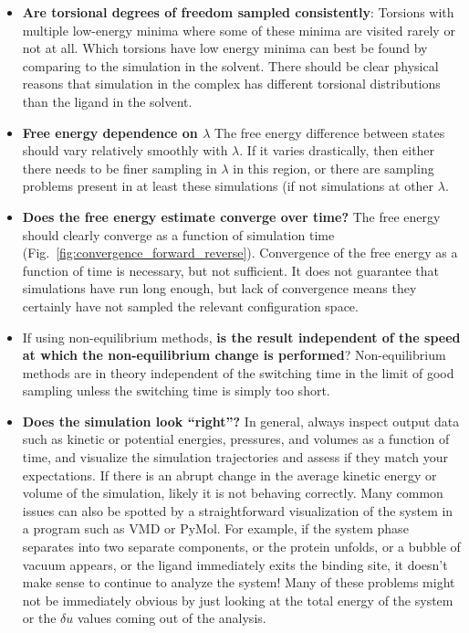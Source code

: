 \begin{itemize}
\item \textbf{Are torsional degrees of freedom sampled consistently}: Torsions with multiple low-energy minima where some of these minima are visited rarely or not at all. Which torsions have low energy minima can best be found by comparing to the simulation in the solvent. There should be clear physical reasons that simulation in the complex has different torsional distributions than the ligand in the solvent. 
\item \textbf{Free energy dependence on $\lambda$} The free energy difference between states should vary relatively smoothly with $\lambda$. If it varies drastically, then either there needs to be finer sampling in $\lambda$ in this region, or there are sampling problems present in at least these simulations (if not simulations at other $\lambda$.
\item \textbf{Does the free energy estimate converge over time?} The free energy should clearly converge as a function of simulation time (Fig.~\ref{fig:convergence_forward_reverse}). Convergence of the free energy as a function of time is necessary, but not sufficient.  It does not guarantee that simulations have run long enough, but lack of convergence means they certainly have not sampled the relevant configuration space.
\item If using non-equilibrium methods, \textbf{is the result independent of the speed at which the non-equilibrium change is performed}? Non-equilibrium methods are in theory independent of the switching time in the limit of good sampling unless the switching time is simply too short. 
\item \textbf{Does the simulation look ``right''?} In general, always inspect output data such as kinetic or potential energies, pressures, and volumes as a function of time, and visualize the simulation trajectories and assess if they match your expectations.  If there is an abrupt change in the average kinetic energy or volume of the simulation, likely it is not behaving correctly.  Many common issues can also be spotted by a straightforward visualization of the system in a program such as VMD or PyMol. For example, if the system phase separates into two separate components, or the protein unfolds, or a bubble of vacuum appears, or the ligand immediately exits the binding site, it doesn't make sense to continue to analyze the system! Many of these problems might not be immediately obvious by just looking at the total energy of the system or the $\delta u$ values coming out of the analysis.
\end{itemize}
